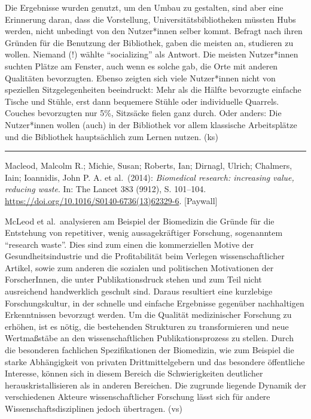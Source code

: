 \documentclass[a4paper,
fontsize=11pt,
oneside,
numbers=noperiodatend,
parskip=half-,
bibliography=totoc,
final
]{scrartcl}
\begin{document}
Die Ergebnisse wurden genutzt, um den Umbau zu gestalten, sind aber eine
Erinnerung daran, dass die Vorstellung, Universitätsbibliotheken müssten
Hubs werden, nicht unbedingt von den Nutzer*innen selber kommt. Befragt
nach ihren Gründen für die Benutzung der Bibliothek, gaben die meisten
an, studieren zu wollen. Niemand (!) wählte \enquote{socializing} als
Antwort. Die meisten Nutzer*innen suchten Plätze am Fenster, auch wenn
es solche gab, die Orte mit anderen Qualitäten bevorzugten. Ebenso
zeigten sich viele Nutzer*innen nicht von speziellen Sitzgelegenheiten
beeindruckt: Mehr als die Hälfte bevorzugte einfache Tische und Stühle,
erst dann bequemere Stühle oder individuelle Quarrels. Couches
bevorzugten nur 5\%, Sitzsäcke fielen ganz durch. Oder anders: Die
Nutzer*innen wollen (auch) in der Bibliothek vor allem klassische
Arbeitsplätze und die Bibliothek hauptsächlich zum Lernen nutzen. (ks)

\begin{center}\rule{0.5\linewidth}{0.5pt}\end{center}

Macleod, Malcolm R.; Michie, Susan; Roberts, Ian; Dirnagl, Ulrich;
Chalmers, Iain; Ioannidis, John P. A. et al.~(2014): \emph{Biomedical
research: increasing value, reducing waste}. In: The Lancet 383 (9912),
S. 101--104. \url{https://doi.org/10.1016/S0140-6736(13)62329-6}.
{[}Paywall{]}

McLeod et al.~analysieren am Beispiel der Biomedizin die Gründe für die
Entstehung von repetitiver, wenig aussagekräftiger Forschung,
sogenanntem \enquote{research waste}. Dies sind zum einen die
kommerziellen Motive der Gesundheitsindustrie und die Profitabilität
beim Verlegen wissenschaftlicher Artikel, sowie zum anderen die sozialen
und politischen Motivationen der ForscherInnen, die unter
Publikationsdruck stehen und zum Teil nicht ausreichend handwerklich
geschult sind. Daraus resultiert eine kurzlebige Forschungskultur, in
der schnelle und einfache Ergebnisse gegenüber nachhaltigen
Erkenntnissen bevorzugt werden. Um die Qualität medizinischer Forschung
zu erhöhen, ist es nötig, die bestehenden Strukturen zu transformieren
und neue Wertmaßstäbe an den wissenschaftlichen Publikationsprozess zu
stellen. Durch die besonderen fachlichen Spezifikationen der Biomedizin,
wie zum Beispiel die starke Abhängigkeit von privaten Drittmittelgebern
und das besondere öffentliche Interesse, können sich in diesem Bereich
die Schwierigkeiten deutlicher herauskristallisieren als in anderen
Bereichen. Die zugrunde liegende Dynamik der verschiedenen Akteure
wissenschaftlicher Forschung lässt sich für andere
Wissenschaftsdisziplinen jedoch übertragen. (vs)
\end{document}
